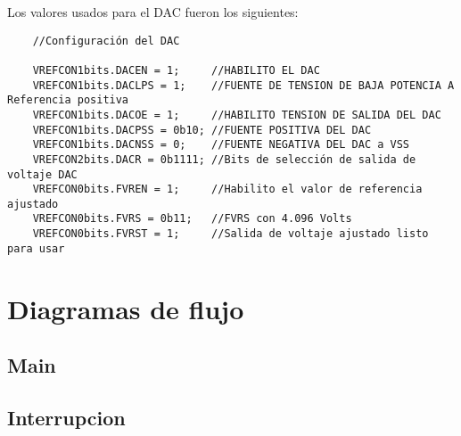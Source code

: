 Los valores usados para el DAC fueron los siguientes:

\begin{verbatim}
    //Configuración del DAC
    
    VREFCON1bits.DACEN = 1;     //HABILITO EL DAC
    VREFCON1bits.DACLPS = 1;    //FUENTE DE TENSION DE BAJA POTENCIA A Referencia positiva
    VREFCON1bits.DACOE = 1;     //HABILITO TENSION DE SALIDA DEL DAC
    VREFCON1bits.DACPSS = 0b10; //FUENTE POSITIVA DEL DAC
    VREFCON1bits.DACNSS = 0;    //FUENTE NEGATIVA DEL DAC a VSS
    VREFCON2bits.DACR = 0b1111; //Bits de selección de salida de voltaje DAC
    VREFCON0bits.FVREN = 1;     //Habilito el valor de referencia ajustado
    VREFCON0bits.FVRS = 0b11;   //FVRS con 4.096 Volts
    VREFCON0bits.FVRST = 1;     //Salida de voltaje ajustado listo para usar
\end{verbatim}

\section{Diagramas de flujo} 

\subsection{Main}



\subsection{Interrupcion}

